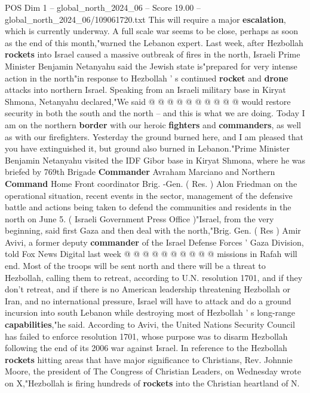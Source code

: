 \begin{textsample}{POS Dim 1 – global\_north\_2024\_06 – Score 19.00 – global\_north\_2024\_06/109061720.txt}
This will require a major \textbf{escalation}, which is currently underway.
A full scale war seems to be close, perhaps as soon as the end of this month,"warned the Lebanon expert.
Last week, after Hezbollah \textbf{rockets} into Israel caused a massive outbreak of fires in the north, Israeli Prime Minister Benjamin Netanyahu said the Jewish state is"prepared for very intense action in the north"in response to Hezbollah ' s continued \textbf{rocket} and \textbf{drone} attacks into northern Israel.
Speaking from an Israeli military base in Kiryat Shmona, Netanyahu declared,"We said @ @ @ @ @ @ @ @ @ @ would restore security in both the south and the north -- and this is what we are doing.
Today I am on the northern \textbf{border} with our heroic \textbf{fighters} and \textbf{commanders}, as well as with our firefighters.
Yesterday the ground burned here, and I am pleased that you have extinguished it, but ground also burned in Lebanon."Prime Minister Benjamin Netanyahu visited the IDF Gibor base in Kiryat Shmona, where he was briefed by 769th Brigade \textbf{Commander} Avraham Marciano and Northern \textbf{Command} Home Front coordinator Brig. -Gen. ( Res. ) Alon Friedman on the operational situation, recent events in the sector, management of the defensive battle and actions being taken to defend the communities and residents in the north on June 5. ( Israeli Government Press Office )"Israel, from the very beginning, said first Gaza and then deal with the north,"Brig.
Gen. ( Res ) Amir Avivi, a former deputy \textbf{commander} of the Israel Defense Forces ' Gaza Division, told Fox News Digital last week @ @ @ @ @ @ @ @ @ @ missions in Rafah will end.
Most of the troops will be sent north and there will be a threat to Hezbollah, calling them to retreat, according to U.N. resolution 1701, and if they don't retreat, and if there is no American leadership threatening Hezbollah or Iran, and no international pressure, Israel will have to attack and do a ground incursion into south Lebanon while destroying most of Hezbollah ' s long-range \textbf{capabilities},"he said.
According to Avivi, the United Nations Security Council has failed to enforce resolution 1701, whose purpose was to disarm Hezbollah following the end of its 2006 war against Israel.
In reference to the Hezbollah \textbf{rockets} hitting areas that have major significance to Christians, Rev.
Johnnie Moore, the president of The Congress of Christian Leaders, on Wednesday wrote on X,"Hezbollah is firing hundreds of \textbf{rockets} into the Christian heartland of N.

\end{textsample}
